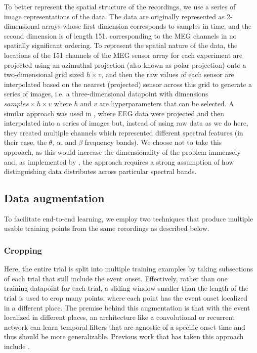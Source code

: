 \documentclass[utf8]{frontiersSCNS} %
\begin{document}
To better represent the spatial structure of the recordings, we use a series of image representations of the data. The data are originally represented as 2-dimensional arrays whose first dimension corresponds to samples in time, and the second dimension is of length 151. corresponding to the MEG channels in no spatially significant ordering. To represent the spatial nature of the data, the locations of the 151 channels of the MEG sensor array for each experiment are projected using an azimuthal projection (also known as polar projection) onto a two-dimensional grid sized $h \times v$, and then the raw values of each sensor are  interpolated based on the nearest (projected) sensor across this grid to generate a series of images, i.e. a three-dimensional datapoint with dimensions $samples \times  h \times v$ where $h$ and $v$ are hyperparameters that can be selected. A similar approach was used in \cite{Bashivan2016}, where EEG data were projected and then interpolated into a series of images but, instead of using raw data as we do here, they created multiple channels which represented different spectral features (in their case, the $\theta$, $\alpha$, and $\beta$ frequency bands). We choose not to take this approach, as this would increase the dimensionality of the problem immensely and, as implemented by \cite{Bashivan2016}, the approach requires a strong assumption of how distinguishing data distributes across particular spectral bands.

\subsection{Data augmentation}

To facilitate end-to-end learning, we employ two techniques that produce multiple usable training points from the same recordings as described below. 

\subsubsection{Cropping}

Here, the entire trial is split into multiple training examples by taking subsections of each trial that still include the event onset. Effectively, rather than one training datapoint for each trial, a sliding window smaller than the length of the trial is used to crop many points, where each point has the event onset localized in a different place. The premise behind this augmentation is that with the event localized in different places, an architecture like a convolutional or recurrent network can learn temporal filters that are agnostic of a specific onset time and thus should be more generalizable. Previous work that has taken this approach include \cite{Schirrmeister2017, Sun}. %
\end{document}
